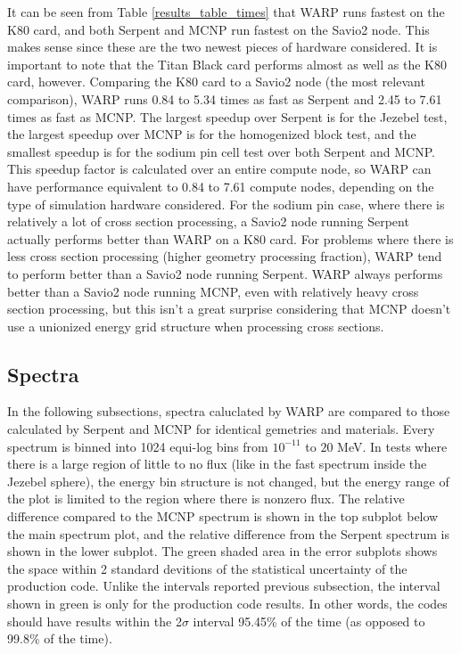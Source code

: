 \documentclass[preprint,12pt]{elsarticle}
\begin{document}
It can be seen from Table \ref{results_table_times} that WARP runs fastest on the K80 card, and both Serpent and MCNP run fastest on the Savio2 node.  This makes sense since these are the two newest pieces of hardware considered.  It is important to note that the Titan Black card performs almost as well as the K80 card, however.  Comparing the K80 card to a Savio2 node (the most relevant comparison), WARP runs 0.84 to 5.34 times as fast as Serpent and 2.45 to 7.61 times as fast as MCNP.   The largest speedup over Serpent is for the Jezebel test, the largest speedup over MCNP is for the homogenized block test, and the smallest speedup is for the sodium pin cell test over both Serpent and MCNP.  This speedup factor is calculated over an entire compute node, so WARP can have performance equivalent to 0.84 to 7.61 compute nodes, depending on the type of simulation hardware considered.  For the sodium pin case, where there is relatively a lot of cross section processing, a Savio2 node running Serpent actually performs better than WARP on a K80 card.  For problems where there is less cross section processing (higher geometry processing fraction), WARP tend to perform better than a Savio2 node running Serpent.  WARP always performs better than a Savio2 node running MCNP, even with relatively heavy cross section processing, but this isn't a great surprise considering that MCNP doesn't use a unionized energy grid structure when processing cross sections.


\subsection{Spectra}

In the following subsections, spectra caluclated by WARP are compared to those calculated by Serpent and MCNP for identical gemetries and materials.  Every spectrum is binned into 1024 equi-log bins from $10^{-11}$ to $20$ MeV.  In tests where there is a large region of little to no flux (like in the fast spectrum inside the Jezebel sphere), the energy bin structure is not changed, but the energy range of the plot is limited to the region where there is nonzero flux.  The relative difference compared to the MCNP spectrum is shown in the top subplot below the main spectrum plot, and the relative difference from the Serpent spectrum is shown in the lower subplot.  The green shaded area in the error subplots shows the space within 2 standard devitions of the statistical uncertainty of the production code.  Unlike the intervals reported previous subsection, the interval shown in green is only for the production code results.  In other words, the codes should have results within the 2$\sigma$ interval 95.45\% of the time (as opposed to 99.8\% of the time).
\end{document}

